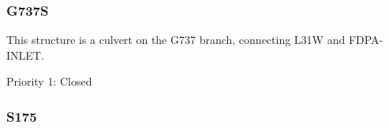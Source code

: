 \clearpage

\subsubsection{G737S}
This structure is a culvert on the G737 branch, connecting L31W and FDPA-INLET.

\begin{packed_items}
\item Priority 1: Closed
\end{packed_items}

%
%


\clearpage




\subsubsection{S175}

